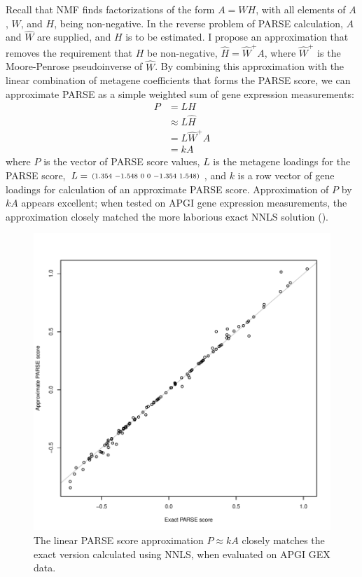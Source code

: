 Recall that \gls{NMF} finds factorizations of the form $A = W H$, with all elements of $A$, $W$, and $H$, being non-negative.  In the reverse problem of \gls{PARSE} calculation, $A$ and $\widehat{W}$ are supplied, and $H$ is to be estimated.  I propose an approximation that removes the requirement that $H$ be non-negative, $\widehat{H} = \widehat{W}^+ A$, where $\widehat{W}^+$ is the Moore-Penrose pseudoinverse of $\widehat{W}$.  By combining this approximation with the linear combination of metagene coefficients that forms the \gls{PARSE} score, we can approximate \gls{PARSE} as a simple weighted sum of gene expression measurements:
\begin{align}
  P &= L H \\
    &\approx L \widehat{H} \\
    &= L \widehat{W}^+ A \\
    &= k A
\end{align}
where $P$ is the vector of \gls{PARSE} score values, $L$ is the metagene loadings for the \gls{PARSE} score, $L = \begin{smallmatrix}(1.354&-1.548&0&0&-1.354&1.548)\end{smallmatrix}$, and $k$ is a row vector of gene loadings for calculation of an approximate \gls{PARSE} score.  Approximation of $P$ by $k A$ appears excellent; when tested on \gls{APGI} gene expression measurements, the approximation closely matched the more laborious exact \gls{NNLS} solution ().

\begin{figure}
\centering
\includegraphics[width=.7\linewidth]{analysis/biosurv/reports/18_SIS_diag_dsd_final/figure/approx-calc-1}
\caption[Performance of the \acrshort{PARSE} score approximation]{The linear \acrshort{PARSE} score approximation $P \approx k A$ closely matches the exact version calculated using \gls{NNLS}, when evaluated on \gls{APGI} \gls{GEX} data.}\label{fig:app-parse-approx-matching}
\end{figure}

